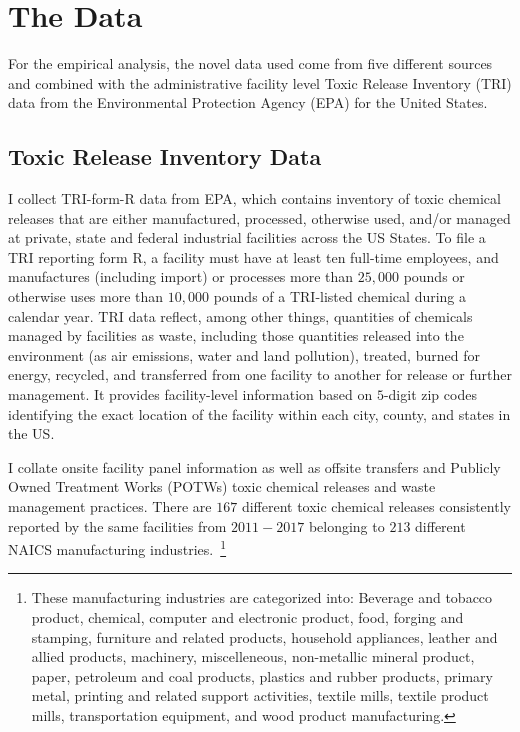 \documentclass[authoryear, preprint, twocolumn, 1p]{elsarticle}
\begin{document}
    \section{The Data}\label{sec:data}
    For the empirical analysis, the novel data used come from five different sources and combined with the administrative facility level Toxic Release Inventory (TRI) data from the Environmental Protection Agency (EPA) for the United States.

    \subsection{Toxic Release Inventory Data}\label{subsec:toxic-release-inventory-data}
    I collect TRI-form-R data from EPA, which contains inventory of toxic chemical releases that are either manufactured, processed, otherwise used, and/or managed at private, state and federal industrial facilities across the US States. To file a TRI reporting form R, a facility must have at least ten full-time employees, and manufactures (including import) or processes more than $25,000$ pounds or otherwise uses more than $10,000$ pounds of a TRI-listed chemical during a calendar year. TRI data reflect, among other things, quantities of chemicals managed by facilities as waste, including those quantities released into the environment (as air emissions, water and land pollution), treated, burned for energy, recycled, and transferred from one facility to another for release or further management. It provides facility-level information based on $5$-digit zip codes identifying the exact location of the facility within each city, county, and states in the US.

    I collate onsite facility panel information as well as offsite transfers and Publicly Owned Treatment Works (POTWs) toxic chemical releases and waste management practices. There are $167$ different toxic chemical releases consistently reported by the same facilities from $2011-2017$ belonging to $213$ different NAICS manufacturing industries.~\footnote{\tiny These manufacturing industries are categorized into: Beverage and tobacco product, chemical, computer and electronic product, food, forging and stamping, furniture and related products, household appliances, leather and allied products, machinery, miscelleneous, non-metallic mineral product, paper, petroleum and coal products, plastics and rubber products, primary metal, printing and related support activities, textile mills, textile product mills, transportation equipment, and wood product manufacturing.}
\end{document}
